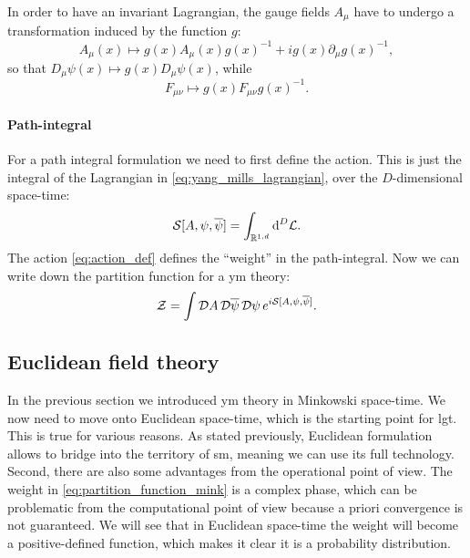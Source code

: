 In order to have an invariant Lagrangian, the gauge fields $A_{\mu}$ have to undergo a transformation induced by the function $g$:
\begin{equation}
    A_{\mu}(x) \mapsto g(x) A_{\mu}(x) g(x)^{-1} + i g(x) \partial_{\mu} g(x)^{-1},
\end{equation}
so that $D_{\mu} \psi(x) \mapsto g(x) D_{\mu} \psi(x)$, while
\begin{equation}
    F_{\mu \nu} \mapsto g(x) F_{\mu \nu} g(x)^{-1}.
\end{equation}


\paragraph*{Path-integral}

For a path integral formulation we need to first define the action.
This is just the integral of the Lagrangian in \eqref{eq:yang_mills_lagrangian}, over the $D$-dimensional space-time:
\begin{equation}
    \mathcal{S}[A, \psi, \overline{\psi}] = \int_{\mathbb{R}^{1,d}}  \dd^{D} \mathcal{L}.
    \label{eq:action_def}
\end{equation}
The action \eqref{eq:action_def} defines the ``weight'' in the path-integral.
Now we can write down the partition function for a \ac{ym} theory:
\begin{equation}
    \mathcal{Z} = \int \mathcal{D} A\, \mathcal{D} \overline{\psi}\, \mathcal{D} \psi \, e^{i \mathcal{S}[A, \psi, \overline{\psi}]}.
    \label{eq:partition_function_mink}
\end{equation}


\subsection{Euclidean field theory}
\label{sub:euclidean_field_theory}

In the previous section we introduced \ac{ym} theory in Minkowski space-time.
We now need to move onto Euclidean space-time, which is the starting point for \ac{lgt}.
This is true for various reasons.
As stated previously, Euclidean formulation allows to bridge into the territory of \ac{sm}, meaning we can use its full technology.
Second, there are also some advantages from the operational point of view.
The weight in \eqref{eq:partition_function_mink} is a complex phase, which can be problematic from the computational point of view because a priori convergence is not guaranteed.
We will see that in Euclidean space-time the weight will become a positive-defined function, which makes it clear it is a probability distribution.

